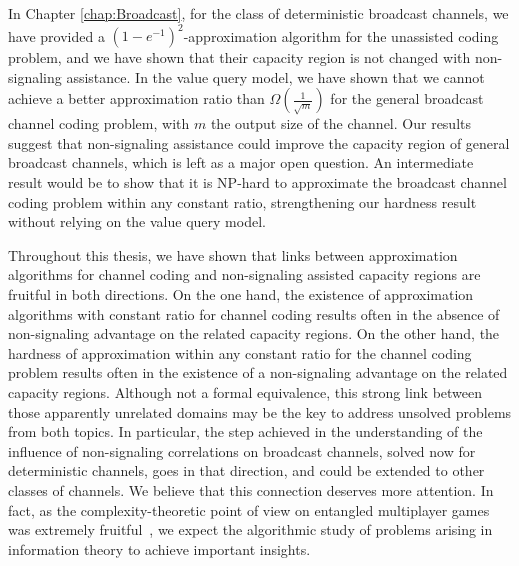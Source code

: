 In Chapter \ref{chap:Broadcast}, for the class of deterministic broadcast channels, we have provided a $(1-e^{-1})^2$-approximation algorithm for the unassisted coding problem, and we have shown that their capacity region is not changed with non-signaling assistance. In the value query model, we have shown that we cannot achieve a better approximation ratio than $\Omega\left(\frac{1}{\sqrt{m}}\right)$ for the general broadcast channel coding problem, with $m$ the output size of the channel. Our results suggest that non-signaling assistance could improve the capacity region of general broadcast channels, which is left as a major open question. An intermediate result would be to show that it is \textrm{NP}-hard to approximate the broadcast channel coding problem within any constant ratio, strengthening our hardness result without relying on the value query model.

Throughout this thesis, we have shown that links between approximation algorithms for channel coding and non-signaling assisted capacity regions are fruitful in both directions. On the one hand, the existence of approximation algorithms with constant ratio for channel coding results often in the absence of non-signaling advantage on the related capacity regions. On the other hand, the hardness of approximation within any constant ratio for the channel coding problem results often in the existence of a non-signaling advantage on the related capacity regions. Although not a formal equivalence, this strong link between those apparently unrelated domains may be the key to address unsolved problems from both topics. In particular, the step achieved in the understanding of the influence of non-signaling correlations on broadcast channels, solved now for deterministic channels, goes in that direction, and could be extended to other classes of channels. We believe that this connection deserves more attention. In fact, as the complexity-theoretic point of view on entangled multiplayer games was extremely fruitful~\cite{JNVWY20}, we expect the algorithmic study of problems arising in information theory to achieve important insights.


